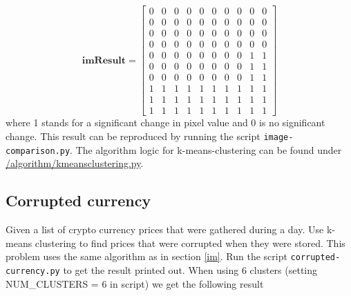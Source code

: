 \documentclass{article}
\begin{document}
        \begin{equation}
            \textbf{imResult} = 
            \begin{bmatrix}
                0 & 0 & 0 & 0 & 0 & 0 & 0 & 0 & 0 & 0 \\
                0 & 0 & 0 & 0 & 0 & 0 & 0 & 0 & 0 & 0 \\
                0 & 0 & 0 & 0 & 0 & 0 & 0 & 0 & 0 & 0 \\
                0 & 0 & 0 & 0 & 0 & 0 & 0 & 0 & 0 & 0 \\
                0 & 0 & 0 & 0 & 0 & 0 & 0 & 0 & 1 & 1 \\
                0 & 0 & 0 & 0 & 0 & 0 & 0 & 0 & 1 & 1 \\
                0 & 0 & 0 & 0 & 0 & 0 & 0 & 0 & 1 & 1 \\
                1 & 1 & 1 & 1 & 1 & 1 & 1 & 1 & 1 & 1 \\
                1 & 1 & 1 & 1 & 1 & 1 & 1 & 1 & 1 & 1 \\
                1 & 1 & 1 & 1 & 1 & 1 & 1 & 1 & 1 & 1
            \end{bmatrix}
        \end{equation}
        where 1 stands for a significant change in pixel value and 0 is no significant change. This result can be reproduced by running the script \texttt{image-comparison.py}. The algorithm logic for k-means-clustering can be found under \url{/algorithm/kmeansclustering.py}.
        
        \subsection{Corrupted currency}
        Given a list of crypto currency prices that were gathered during a day. Use k-means clustering to find prices that were corrupted when they were stored. This problem uses the same algorithm as in section \ref{im}. Run the script \texttt{corrupted-currency.py} to get the result printed out. When using 6 clusters (setting NUM\_CLUSTERS = 6 in script) we get the following result
        
\end{document}
